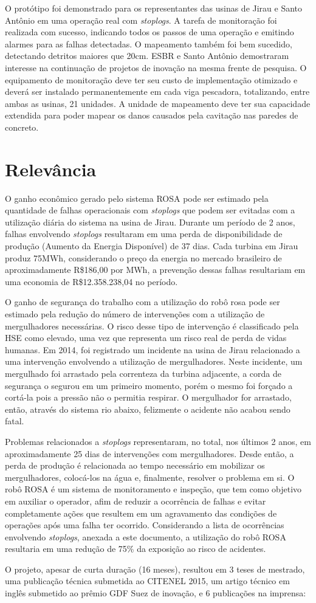 O protótipo foi demonstrado para os representantes das usinas de Jirau e Santo
Antônio em uma operação real com \textit{stoplogs}. A tarefa de monitoração foi
realizada com sucesso, indicando todos os passos de uma operação e emitindo
alarmes para as falhas detectadas. O mapeamento também foi bem sucedido,
detectando detritos maiores que 20cm. ESBR e Santo Antônio demostraram interesse
na continuação de projetos de inovação na mesma frente de pesquisa. O
equipamento de monitoração deve ter seu custo de implementação otimizado e
deverá ser instalado permanentemente em cada viga pescadora, totalizando, entre
ambas as usinas, 21 unidades. A unidade de mapeamento deve ter sua capacidade
extendida para poder mapear os danos causados pela cavitação nas paredes de
concreto.
 
\section{Relevância}
O ganho econômico gerado pelo sistema ROSA pode ser estimado pela quantidade de
falhas operacionais com \textit{stoplogs} que podem ser evitadas com a
utilização diária do sistema na usina de Jirau. Durante um período de 2 anos,
falhas envolvendo \textit{stoplogs} resultaram em uma perda de disponibilidade
de produção (Aumento da Energia Disponível) de 37 dias. Cada turbina
em Jirau produz 75MWh, considerando o preço da energia no mercado brasileiro de
aproximadamente R\$186,00 por MWh, a prevenção dessas falhas resultariam em uma
economia de R\$12.358.238,04 no período.

O ganho de segurança do trabalho com a utilização do robô rosa pode ser estimado
pela redução do número de intervenções com a utilização de mergulhadores
necessárias. O risco desse tipo de intervenção é classificado pela HSE como
elevado, uma vez que representa um risco real de perda de vidas humanas. Em
2014, foi registrado um incidente na usina de Jirau relacionado a uma
intervenção envolvendo a utilização de mergulhadores. Neste incidente, um
mergulhado foi arrastado pela correnteza da turbina adjacente, a corda de
segurança o segurou em um primeiro momento, porém o mesmo foi forçado a cortá-la
pois a pressão não o permitia respirar. O mergulhador for arrastado, então,
através do sistema rio abaixo, felizmente o acidente não acabou sendo fatal.

Problemas relacionados a \textit{stoplogs} representaram, no total, nos últimos
2 anos, em aproximadamente 25 dias de intervenções com mergulhadores. Desde
então, a perda de produção é relacionada ao tempo necessário em mobilizar os
mergulhadores, colocá-los na água e, finalmente, resolver o problema em si. O
robô ROSA é um sistema de monitoramento e inspeção, que tem como objetivo
em auxiliar o operador, afim de reduzir a ocorrência de falhas e evitar
completamente ações que resultem em um agravamento das condições de operações
após uma falha ter ocorrido. Considerando a lista de ocorrências envolvendo
\textit{stoplogs}, anexada a este documento, a utilização do robô ROSA
resultaria em uma redução de 75\% da exposição ao risco de acidentes. 

O projeto, apesar de curta duração (16 meses), resultou em 3 teses de 
mestrado, uma publicação técnica submetida ao CITENEL 2015, um artigo técnico 
em inglês submetido ao prêmio GDF Suez de inovação, e 6 publicações na imprensa: 
 


